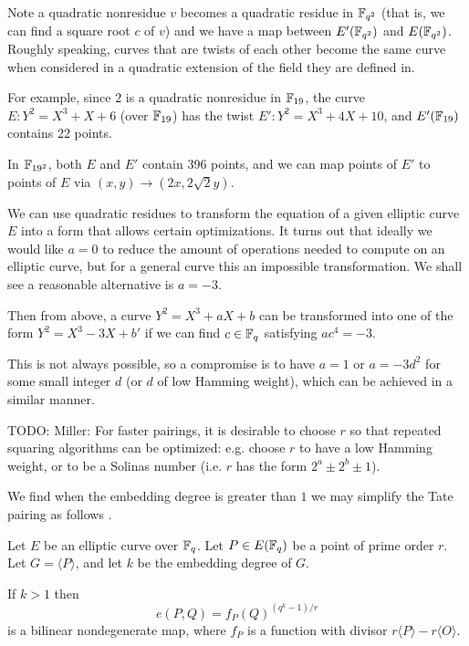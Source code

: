 Note a quadratic
nonresidue $v$ becomes a quadratic residue in $\mathbb{F}_{q^2}$ (that is, we
can find a square root $c$ of $v$)
and we have a map between
$E'(\mathbb{F}_{q^2})$ and $E(\mathbb{F}_{q^2})$. Roughly speaking, curves that are twists
of each other become the same curve when considered in a quadratic extension
of the field they are defined in.

For example, since $2$ is a quadratic nonresidue in $\mathbb{F}_{19}$,
the curve $E : Y^2 = X^3 + X + 6$ (over $\mathbb{F}_{19}$) has the
twist $E': Y^2 = X^3 + 4 X + 10$, and $E'(\mathbb{F}_{19})$ contains 22 points.

In $\mathbb{F}_{19^2}$, both $E$ and $E'$ contain 396 points, and we can map
points of $E'$ to points of $E$ via $(x,y) \rightarrow (2 x, 2\sqrt{2} y)$.

We can use quadratic residues to transform the equation of a given elliptic
curve $E$ into a form that allows certain optimizations.
It turns out that ideally we would like $a = 0$ to reduce the amount of
operations needed to compute on an elliptic curve, but for a general curve
this an impossible transformation. We shall see a reasonable alternative
is $a = -3$.

Then from above, a curve $Y^2 = X^3 + aX + b$ can be transformed into
one of the form $Y^2 = X^3 - 3X + b'$ if we can find $c\in \mathbb{F}_q$
satisfying $a c^4 = -3$.

This is not always possible, so a compromise is to have
$a = 1$ or $a = -3 d^2$ for some small integer $d$
(or $d$ of low Hamming weight), which can be achieved in a similar manner.


TODO: Miller:
For faster pairings, it is desirable to choose $r$ so that repeated squaring
algorithms can be optimized: e.g. choose $r$ to have a low Hamming weight,
or to be a Solinas number (i.e. $r$ has the form $2^a \pm 2^b \pm 1$).

We find when the embedding degree is greater than $1$ we may simplify
the Tate pairing as follows \cite{barreto, barreto2}.
\begin{theorem}
Let $E$ be an elliptic curve over $\mathbb{F}_q$.
Let $P \in E(\mathbb{F}_q)$ be a point of prime order $r$.
Let $G = \langle P \rangle$, and let $k$ be the embedding degree of $G$.

If $k > 1$ then
\[
e(P,Q) = f_P(Q)^{(q^k-1)/r}
\]
is a bilinear nondegenerate map,
where $f_P$ is a function with divisor $r\langle P\rangle - r\langle O\rangle$.
\end{theorem}

